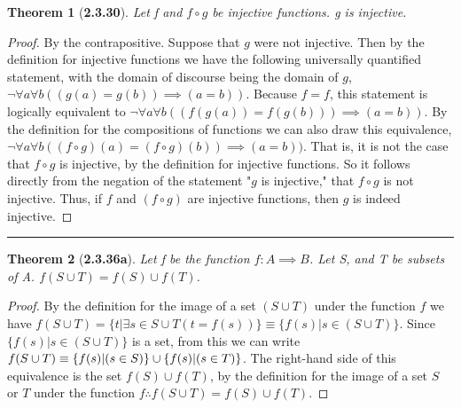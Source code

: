 \documentclass[a4paper, 12pt]{article}
\theoremstyle{plain}
\newtheorem*{theorem*}{Theorem}
\begin{document}
\begin{theorem*}[\textbf{2.3.30}]
    Let f and $f \circ g$ be injective functions. g is injective.
\end{theorem*}

\begin{proof}
    By the contrapositive. Suppose that $g$ were not injective. Then by the definition for 
    injective functions we have the following universally quantified statement, with the domain 
    of discourse being the domain of $g$, \newline 
    $\lnot \forall a \forall b ((g(a) = g(b)) \implies (a = b))$. Because $f = f$, this 
    statement is logically equivalent to 
    $\lnot \forall a \forall b ((f(g(a)) = f(g(b))) \implies (a = b))$. By the \newline 
    definition for the compositions of functions we can also draw this equivalence, 
    $\lnot \forall a \forall b ((f \circ g)(a) = (f \circ g)(b)) \implies (a = b))$. That is, 
    it is not the case that $f \circ g$ is injective, by the definition for injective functions. 
    So it follows directly from the negation of the statement "$g$ is injective," that 
    $f \circ g$ is not injective. Thus, if $f$ and $(f \circ g)$ are injective functions, then 
    $g$ is indeed injective.
\end{proof}
\begin{center}
    \rule{5.4in}{1pt}
\end{center}


\begin{theorem*}[\textbf{2.3.36a}]
    Let f be the function $f: A \implies B$. Let S, and T be subsets of A. 
    $f(S \cup T) = f(S) \cup f(T)$.
\end{theorem*}

\begin{proof}
    By the definition for the image of a set $(S \cup T)$ under the function $f$ we have 
    $f(S \cup T) = \{t | \exists s \in S \cup T (t = f(s))\} 
    \equiv \{f(s) | s \in (S \cup T)\}$. Since $\{f(s) | s \in (S \cup T)\}$ is a set, from 
    this we can write $f(S \cup T) \equiv 
    \newline \{f(s) | (s \in S)\} \cup \{f(s) | (s \in T)\}$. The right-hand side of this 
    equivalence is the set $f(S) \cup f(T)$, by the definition for the image of a set $S$ or 
    $T$ under the function $f \therefore f(S \cup T) = f(S) \cup f(T)$.
\end{proof}
\end{document}
